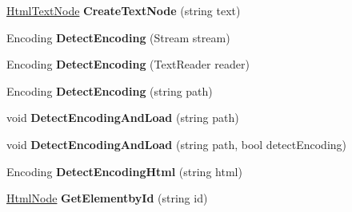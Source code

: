 \begin{DoxyCompactItemize}
\item 
\mbox{\label{class_html_agility_pack_1_1_html_document_a533a68a21e689842a948caa6df3e99e5}} 
\hyperlink{class_html_agility_pack_1_1_html_text_node}{Html\+Text\+Node} {\bfseries Create\+Text\+Node} (string text)
\item 
\mbox{\label{class_html_agility_pack_1_1_html_document_a0822e4ac2ca2afef5b5906ecfad68f30}} 
Encoding {\bfseries Detect\+Encoding} (Stream stream)
\item 
\mbox{\label{class_html_agility_pack_1_1_html_document_a714da63e5ce9bd5ebe2ce86e9c2802b4}} 
Encoding {\bfseries Detect\+Encoding} (Text\+Reader reader)
\item 
\mbox{\label{class_html_agility_pack_1_1_html_document_a76392972fe9d293f4715b662cf258df5}} 
Encoding {\bfseries Detect\+Encoding} (string path)
\item 
\mbox{\label{class_html_agility_pack_1_1_html_document_a758381d93cc11a8399a368a17f05577d}} 
void {\bfseries Detect\+Encoding\+And\+Load} (string path)
\item 
\mbox{\label{class_html_agility_pack_1_1_html_document_a44ea3489f81042acbce1e9824af45d4f}} 
void {\bfseries Detect\+Encoding\+And\+Load} (string path, bool detect\+Encoding)
\item 
\mbox{\label{class_html_agility_pack_1_1_html_document_aadb4046a4fdb71a31fd57357bfd5a5c4}} 
Encoding {\bfseries Detect\+Encoding\+Html} (string html)
\item 
\mbox{\label{class_html_agility_pack_1_1_html_document_a7844186a975f7d965f8333c998fb8008}} 
\hyperlink{class_html_agility_pack_1_1_html_node}{Html\+Node} {\bfseries Get\+Elementby\+Id} (string id)
\item 
\mbox{\label{class_html_agility_pack_1_1_html_document_ad242d26abadad4ed8f73e4391333949d}} 

\end{DoxyCompactItemize}
